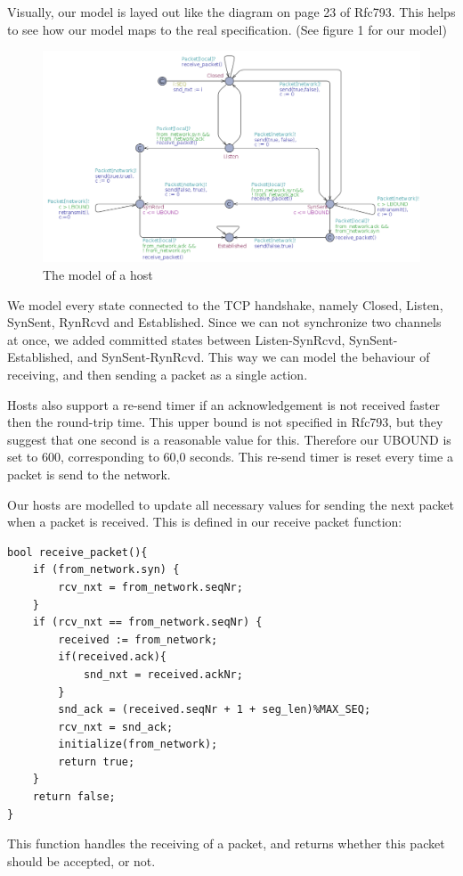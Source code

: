 \documentclass[twocolumn]{article}
\begin{document}
Visually, our model is layed out like the diagram on page 23 of Rfc793. This helps to see how our model maps to the real specification. (See figure 1 for our model)
\begin{figure}
  \includegraphics[width=\textwidth]{host_model}
  \caption{The model of a host}
\end{figure}
We model every state connected to the TCP handshake, namely Closed, Listen, SynSent, RynRcvd and Established. Since we can not synchronize two channels at once, we added committed states between Listen-SynRcvd, SynSent-Established, and SynSent-RynRcvd. This way we can model the behaviour of receiving, and then sending a packet as a single action.

Hosts also support a re-send timer if an acknowledgement is not received faster then the round-trip time. This upper bound is not specified in Rfc793, but they suggest that one second is a reasonable value for this. Therefore our UBOUND is set to 600, corresponding to 60,0 seconds. This re-send timer is reset every time a packet is send to the network.

Our hosts are modelled to update all necessary values for sending the next packet when a packet is received. This is defined in our receive packet function:
\begin{verbatim}
bool receive_packet(){
	if (from_network.syn) {
		rcv_nxt = from_network.seqNr;
	}
	if (rcv_nxt == from_network.seqNr) {
		received := from_network;
		if(received.ack){
			snd_nxt = received.ackNr;
		}
		snd_ack = (received.seqNr + 1 + seg_len)%MAX_SEQ;
		rcv_nxt = snd_ack;
		initialize(from_network);
		return true;
	}
	return false;
}
\end{verbatim}

This function handles the receiving of a packet, and returns whether this packet should be accepted, or not.
\end{document}
